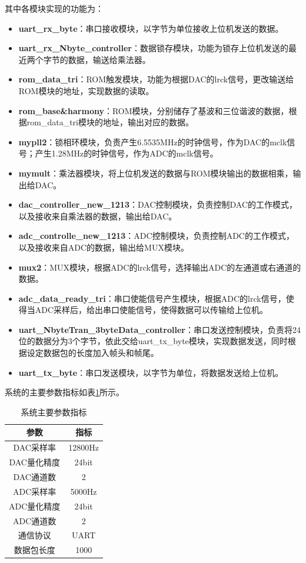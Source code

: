\documentclass[UTF8]{ctexart}
\begin{document}
其中各模块实现的功能为：
\begin{itemize}
    \item \textbf{uart\_rx\_byte}：串口接收模块，以字节为单位接收上位机发送的数据。
    \item \textbf{uart\_rx\_Nbyte\_controller}：数据锁存模块，功能为锁存上位机发送的最近两个字节的数据，输送给乘法器。
    \item \textbf{rom\_data\_tri}：ROM触发模块，功能为根据DAC的lrck信号，更改输送给ROM模块的地址，实现数据的读取。
    \item \textbf{rom\_base\&harmony}：ROM模块，分别储存了基波和三位谐波的数据，根据rom\_data\_tri模块的地址，输出对应的数据。
    \item \textbf{mypll2}：锁相环模块，负责产生6.5535MHz的时钟信号，作为DAC的mclk信号；产生1.28MHz的时钟信号，作为ADC的mclk信号。
    \item \textbf{mymult}：乘法器模块，将上位机发送的数据与ROM模块输出的数据相乘，输出给DAC。
    \item \textbf{dac\_controller\_new\_1213}：DAC控制模块，负责控制DAC的工作模式，以及接收来自乘法器的数据，输出给DAC。
    \item \textbf{adc\_controlle\_new\_1213}：ADC控制模块，负责控制ADC的工作模式，以及接收来自ADC的数据，输出给MUX模块。
    \item \textbf{mux2}：MUX模块，根据ADC的lrck信号，选择输出ADC的左通道或右通道的数据。
    \item \textbf{adc\_data\_ready\_tri}：串口使能信号产生模块，根据ADC的lrck信号，使得当ADC采样后，给出串口使能信号，使得数据可以传输给上位机。
    \item \textbf{uart\_NbyteTran\_3byteData\_controller}：串口发送控制模块，负责将24位的数据分为3个字节，依此交给uart\_tx\_byte模块，实现数据发送，同时根据设定数据包的长度加入帧头和帧尾。
    \item \textbf{uart\_tx\_byte}：串口发送模块，以字节为单位，将数据发送给上位机。
\end{itemize}

系统的主要参数指标如表\ref{tab:parameter}所示。

\begin{table}[!ht]
    \centering
    \caption{系统主要参数指标}
    \label{tab:parameter}
    \begin{tabular}{|c|c|}
        \hline
        参数 & 指标 \\
        \hline
        DAC采样率 & 12800Hz \\
        \hline
        DAC量化精度 & 24bit \\
        \hline
        DAC通道数 & 2 \\
        \hline
        ADC采样率 & 5000Hz \\
        \hline
        ADC量化精度 & 24bit \\
        \hline
        ADC通道数 & 2 \\
        \hline
        通信协议 & UART \\
        \hline
        数据包长度 & 1000 \\
        \hline
    \end{tabular}
\end{table}
\end{document}
